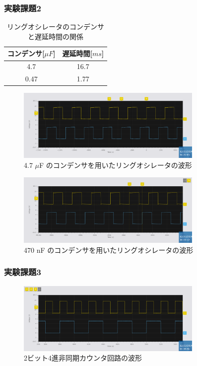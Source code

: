 \documentclass{ltjsarticle}
\begin{document}
\subsubsection{実験課題2}
\begin{table}[H]
  \centering
  \begin{tabular}{|c|c|}
  \hline
  コンデンサ[${\mu F}$] & 遅延時間[${ms}$] \\ \hline
  4.7 & 16.7  \\ \hline
  0.47 & 1.77 \\ \hline
  \end{tabular}
  \caption{リングオシレータのコンデンサと遅延時間の関係}
  \label{tab:results_2}
\end{table}

\begin{figure}[H]
  \centering
  \includegraphics[width=0.8\textwidth]{figs/2-4700nF.png}
  \caption{4.7 $\mu$F のコンデンサを用いたリングオシレータの波形}
  \label{fig:2_4.7_experiment_results}
\end{figure}

\begin{figure}[H]
  \centering
  \includegraphics[width=0.8\textwidth]{figs/2-470nF.png}
  \caption{470 nF のコンデンサを用いたリングオシレータの波形}
  \label{fig:2_470_experiment_results}
\end{figure}

\subsubsection{実験課題3}
\begin{figure}[H]
  \centering
  \includegraphics[width=0.8\textwidth]{figs/3-flipflop.png}
  \caption{2ビット4進非同期カウンタ回路の波形}
  \label{fig:3_experiment_results}
\end{figure}
\end{document}
